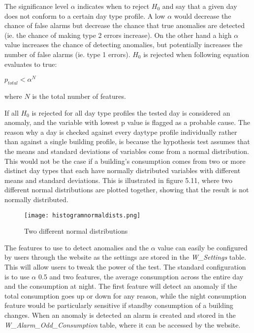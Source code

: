 The significance level $\alpha$ indicates when to reject $H_0$ and say that a given day does not conform to a certain day type profile. A low $\alpha$ would decrease the chance of false alarms but decrease the chance that true anomalies are detected (ie. the chance of making type 2 errors increase). On the other hand a high $\alpha$ value increases the chance of detecting anomalies, but potentially increases the number of false alarms (ie. type 1 errors). $H_0$ is rejected when following equation evaluates to true:
\begin{center}
$p_{total} <\alpha^N$
\end{center}
where $N$ is the total number of features.

If all $H_0$ is rejected for all day type profiles the tested day is considered an anomaly, and the variable with lowest p value is flagged as a probable cause. The reason why a day is checked against every daytype profile individually rather than against a single building profile, is because the hypothesis test assumes that the means and standard deviations of variables come from a normal distribution. This would not be the case if a building's consumption comes from two or more distinct day types that each have normally distributed variables with different means and standard deviations. This is illustrated in figure 5.11, where two different normal distributions are plotted together, showing that the result is not normally distributed.
\begin{figure}
\begin{center}
\texttt{[image: histogramnormaldists.png]}
\end{center}
\caption{Two different normal distributions}
\end{figure}

The features to use to detect anomalies and the $\alpha$ value can easily be configured by users through the website as the settings are stored in the \emph{W\_Settings} table. This will allow users to tweak the power of the test. The standard configuration is to use $\alpha$ 0.5 and two features, the average consumption across the entire day and the consumption at night. The first feature will detect an anomaly if the total consumption goes up or down for any reason, while the night consumption feature would be particularly sensitive if standby consumption of a building changes. When an anomaly is detected an alarm is created and stored in the \emph{W\_Alarm\_Odd\_Consumption} table, where it can be accessed by the website.
\newline
